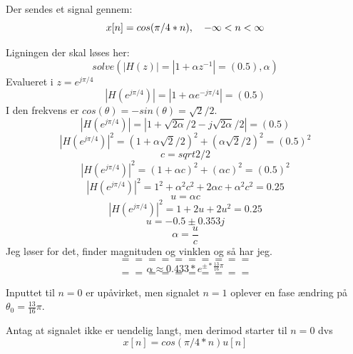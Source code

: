 \begin{EksamensOpgaver}
\begin{Eksamenssæt}
\begin{eksamensOpgave}
            Der sendes et signal gennem: 
            \[x[n] = cos(\pi/4 * n), \tab{0} -\infty < n < \infty\]
            \begin{UnderOpgave}
                Ligningen der skal løses her: 
                \[solve(|H(z)| = |1 + \alpha z^{-1}| = (0.5), \alpha)\]
                Evalueret i $z = e^{j\pi/4}$
                \[|H(e^{j\pi/4})| = |1 + \alpha e^{-j\pi/4}| = (0.5)\]
                I den frekvens er $cos(\theta) = -sin(\theta) = \sqrt{2}/2$. 
                \[|H(e^{j\pi/4})| = |1 + \sqrt{2\alpha}/2 - j\sqrt{2\alpha}/2| = (0.5)\]
                \[|H(e^{j\pi/4})|^2 = (1 + \alpha\sqrt{2}/2)^2 + (\alpha\sqrt{2}/2)^2 = (0.5)^2\]
                \[c = sqrt{2}/2\]
                \[|H(e^{j\pi/4})|^2 = (1 + \alpha c)^2 + (\alpha c)^2 = (0.5)^2\]
                \[|H(e^{j\pi/4})|^2 = 1^2 + \alpha^2c^2 + 2\alpha c + \alpha^2c^2 = 0.25\]
                \[u = \alpha c\]
                \[|H(e^{j\pi/4})|^2 = 1 + 2u + 2u^2 = 0.25\]
                \[u = -0.5 \pm 0.353j\]
                \[\alpha = \frac{u}{c}\]
                Jeg løser for det, finder magnituden og vinklen og så har jeg.
                \[==========\] 
                \[\alpha \approx 0.433*e^{\pm * \frac{13}{16} \pi}\]
                \[==========\]
            \end{UnderOpgave}
            \begin{UnderOpgave}
                Inputtet til $n = 0$ er upåvirket, men signalet $n = 1$ oplever en fase ændring på $\theta_0 = \frac{13}{16}\pi$.                       
            \end{UnderOpgave}
            Antag at signalet ikke er uendelig langt, men derimod starter til $n = 0$ dvs
            \[x[n] = cos(\pi/4 * n)u[n]\]
            

\end{eksamensOpgave}
\end{Eksamenssæt}
\end{EksamensOpgaver}
